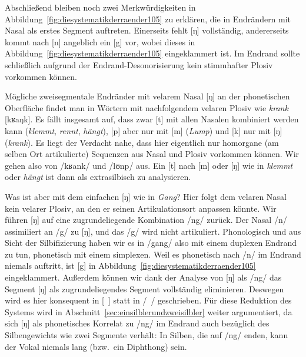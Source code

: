 \begin{exe}
  \ex \label{ex:diesystematikderraender117}
  \begin{xlist}
  \end{xlist}
\end{exe}

Abschließend bleiben noch zwei Merkwürdigkeiten in Abbildung~\ref{fig:diesystematikderraender105} zu erklären, die in Endrändern mit Nasal als erstes Segment auftreten.
Einerseits fehlt [ŋ] vollständig, andererseits kommt nach [n] angeblich ein [g] vor, wobei dieses in Abbildung~\ref{fig:diesystematikderraender105} eingeklammert ist.
Im Endrand sollte schließlich aufgrund der Endrand-Desonorisierung kein stimmhafter Plosiv vorkommen können.

Mögliche zweisegmentale Endränder mit velarem Nasal [ŋ] an der phonetischen Oberfläche findet man in Wörtern mit nachfolgendem velaren Plosiv wie \textit{krank} [kʁaŋk].
Es fällt insgesamt auf, dass zwar [t] mit allen Nasalen kombiniert werden kann (\textit{klemmt}, \textit{rennt}, \textit{hängt}), [p] aber nur mit [m] (\textit{Lump}) und [k] nur mit [ŋ] (\textit{krank}).
Es liegt der Verdacht nahe, dass hier eigentlich nur homorgane (am selben Ort artikulierte) Sequenzen aus Nasal und Plosiv vorkommen können.
Wir gehen also von /kʁank/ \phopro [kʁaŋk] und /lʊnp/ \phopro [lʊmp] aus.
Ein [t] nach [m] oder [ŋ] wie in \textit{klemmt} oder \textit{hängt} ist dann als extrasilbisch zu analysieren.

Was ist aber mit dem einfachen [ŋ] wie in \textit{Gang}?
Hier folgt dem velaren Nasal kein velarer Plosiv, an den er seinen Artikulationsort anpassen könnte.
Wir führen [ŋ] auf eine zugrundeliegende Kombination /ng/ zurück.
Der Nasal /n/ assimiliert an /g/ zu [ŋ], und das /g/ wird nicht artikuliert.
Phonologisch und aus Sicht der Silbifizierung haben wir es \zB in /gang/ also mit einem duplexen Endrand zu tun, phonetisch mit einem simplexen.
Weil es phonetisch nach /n/ im Endrand niemals auftritt, ist [g] in Abbildung~\ref{fig:diesystematikderraender105} eingeklammert.
Außerdem können wir dank der Analyse von [ŋ] als /ng/ das Segment [ŋ] als zugrundeliegendes Segment vollständig eliminieren.
Deswegen wird es hier konsequent in [~] statt in /~/ geschrieben.
Für diese Reduktion des Systems wird in Abschnitt~\ref{sec:einsilblerundzweisilbler} weiter argumentiert, da sich [ŋ] als phonetisches Korrelat zu /ng/ im Endrand auch bezüglich des Silbengewichts wie zwei Segmente verhält:
In Silben, die auf /ng/ enden, kann der Vokal niemals lang (bzw.\ ein Diphthong) sein.

